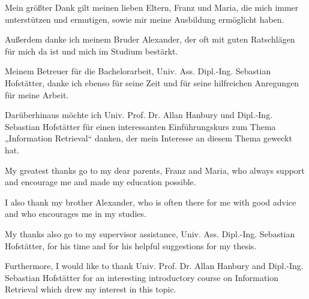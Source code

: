 \documentclass[draft,final]{vutinfth} %
\begin{document}
\frontmatter %

\addstatementpage

\begin{danksagung*}
Mein größter Dank gilt meinen lieben Eltern, Franz und Maria, die mich immer
    unterstützen und ermutigen, sowie mir meine Ausbildung ermöglicht haben.

Außerdem danke ich meinem Bruder Alexander, der oft mit guten Ratschlägen für
    mich da ist und mich im Studium bestärkt.

Meinem Betreuer für die Bachelorarbeit, Univ. Ass. Dipl.-Ing. Sebastian Hofstätter,
    danke ich ebenso für seine Zeit und für seine hilfreichen Anregungen für 
    meine Arbeit.

Darüberhinaus möchte ich Univ. Prof. Dr. Allan Hanbury und 
    Dipl.-Ing. Sebastian Hofstätter für einen interessanten 
    Einführungskurs zum Thema „Information Retrieval“ danken, 
    der mein Interesse an diesem Thema geweckt hat.
\end{danksagung*}

\begin{acknowledgements*}
My greatest thanks go to my dear parents, Franz and Maria, who always support 
    and encourage me and made my education possible. 

I also thank my brother Alexander, who is often there for me with good advice 
    and who encourages me in my studies.

My thanks also go to my supervisor assistance, Univ. Ass. Dipl.-Ing. Sebastian Hofstätter, 
    for his time and for his helpful suggestions for my thesis.

Furthermore, I would like to thank Univ. Prof. Dr. Allan Hanbury 
    and Dipl.-Ing. Sebastian Hofstätter for an interesting introductory 
    course on Information Retrieval which drew my interest in this topic.
\end{acknowledgements*}

\begin{kurzfassung}
\end{kurzfassung}


\begin{abstract}
\end{abstract}
\end{document}
